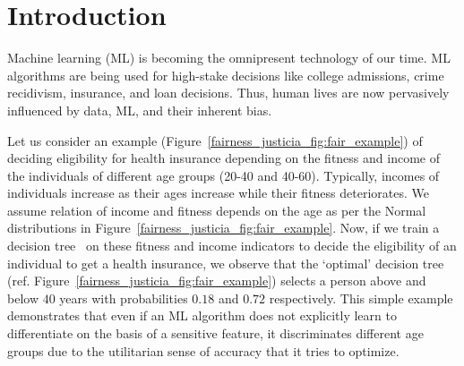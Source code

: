 \section{Introduction}
Machine learning (ML) is becoming the omnipresent technology of our time. 
ML algorithms are being used for high-stake decisions like college admissions, crime recidivism, insurance, and loan decisions.
Thus, human lives are now pervasively influenced by data, ML, and their inherent bias.

\begin{example}\label{fairness_justicia_example:intro}
Let us consider an example (Figure~\ref{fairness_justicia_fig:fair_example}) of deciding eligibility for health insurance depending on the fitness and income of the individuals of different age groups (20-40 and 40-60).
Typically, incomes of individuals increase as their ages increase while their fitness deteriorates.
We assume relation of income and fitness depends on the age as per the Normal distributions in Figure~\ref{fairness_justicia_fig:fair_example}.
Now, if we train a decision tree~\cite{narodytska2018learning} on these fitness and income indicators to decide the eligibility of an individual to get a health insurance, we observe that the `optimal' decision tree (ref. Figure~\ref{fairness_justicia_fig:fair_example}) selects a person above and below $40$ years with probabilities $0.18$ and $0.72$ respectively.
This simple example demonstrates that even if an ML algorithm does not explicitly learn to differentiate on the basis of a sensitive feature, it discriminates different age groups due to the utilitarian sense of accuracy that it tries to optimize.
\end{example}

